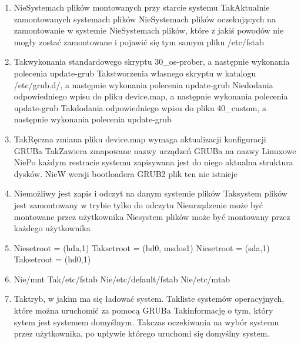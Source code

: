 \begin{enumerate}
	\item {}
	{Nie}{Systemach plików montowanych przy starcie systemu}
	{Tak}{Aktualnie zamontowanych systemach plików}
	{Nie}{Systemach plików oczekujących na zamontowanie w systemie}
	{Nie}{Systemach plików, które z jakiś powodów nie mogły zostać zamontowane i pojawić się tym samym pliku /etc/fstab}
	
	\newpage
	
	\item {}
	{Tak}{wykonania standardowego skryptu 30\_os-prober, a następnie wykonania polecenia update-grub}
	{Tak}{stworzenia własnego skryptu w katalogu /etc/grub.d/, a następnie wykonania polecenia update-grub}
	{Nie}{dodania odpowiedniego wpisu do pliku device.map, a następnie wykonania polecenia update-grub}
	{Tak}{dodania odpowiedniego wpisu do pliku 40\_custom, a następnie wykonania polecenia update-grub}
	
	\item {}
	{Tak}{Ręczna zmiana pliku device.map wymaga aktualizacji konfiguracji GRUBa}
	{Tak}{Zawiera zmapowane nazwy urządzeń GRUBa na nazwy Linuxowe}
	{Nie}{Po każdym restracie systemu zapisywana jest do niego aktualna struktura dysków.}
	{Nie}{W wersji bootloadera GRUB2 plik ten nie istnieje}
	
	\item {}
	{Nie}{możliwy jest zapis i odczyt na danym systemie plików}
	{Tak}{system plików jest zamontowany w trybie tylko do odczytu}
	{Nie}{urządzenie może być montowane przez użytkownika}
	{Nie}{system plików może być montowany przez każdego użytkownika}
	
	\item {}
	{Nie}{setroot = (hda,1)}
	{Tak}{setroot = (hd0, msdos1)}
	{Nie}{setroot = (sda,1)}
	{Tak}{setroot = (hd0,1)}
	
	\item {}
	{Nie}{/mnt}
	{Tak}{/etc/fstab}
	{Nie}{/etc/default/fstab}
	{Nie}{/etc/mtab}
	
	\item {}
	{Tak}{tryb, w jakim ma się ładować system.}
	{Tak}{liste systemów operacyjnych, które można uruchomić za pomocą GRUBa}
	{Tak}{informację o tym, który sytem jest systemem domyślnym.}
	{Tak}{czas oczekiwania na wybór systemu przez użytkownika, po upływie którego uruchomi się domyślny system.}
	

\end{enumerate}
